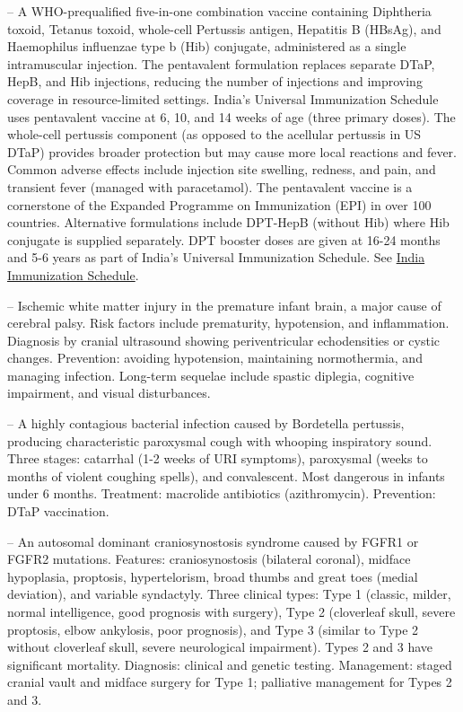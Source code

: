 -- A WHO-prequalified five-in-one combination vaccine containing Diphtheria toxoid, Tetanus toxoid, whole-cell Pertussis antigen, Hepatitis B (HBsAg), and Haemophilus influenzae type b (Hib) conjugate, administered as a single intramuscular injection. The pentavalent formulation replaces separate DTaP, HepB, and Hib injections, reducing the number of injections and improving coverage in resource-limited settings. India's Universal Immunization Schedule uses pentavalent vaccine at 6, 10, and 14 weeks of age (three primary doses). The whole-cell pertussis component (as opposed to the acellular pertussis in US DTaP) provides broader protection but may cause more local reactions and fever. Common adverse effects include injection site swelling, redness, and pain, and transient fever (managed with paracetamol). The pentavalent vaccine is a cornerstone of the Expanded Programme on Immunization (EPI) in over 100 countries. Alternative formulations include DPT-HepB (without Hib) where Hib conjugate is supplied separately. DPT booster doses are given at 16-24 months and 5-6 years as part of India's Universal Immunization Schedule. See \hyperlink{India Immunization Schedule}{India Immunization Schedule}.

-- Ischemic white matter injury in the premature infant brain, a major cause of cerebral palsy. Risk factors include prematurity, hypotension, and inflammation. Diagnosis by cranial ultrasound showing periventricular echodensities or cystic changes. Prevention: avoiding hypotension, maintaining normothermia, and managing infection. Long-term sequelae include spastic diplegia, cognitive impairment, and visual disturbances.

-- A highly contagious bacterial infection caused by Bordetella pertussis, producing characteristic paroxysmal cough with whooping inspiratory sound. Three stages: catarrhal (1-2 weeks of URI symptoms), paroxysmal (weeks to months of violent coughing spells), and convalescent. Most dangerous in infants under 6 months. Treatment: macrolide antibiotics (azithromycin). Prevention: DTaP vaccination.

-- An autosomal dominant craniosynostosis syndrome caused by FGFR1 or FGFR2 mutations. Features: craniosynostosis (bilateral coronal), midface hypoplasia, proptosis, hypertelorism, broad thumbs and great toes (medial deviation), and variable syndactyly. Three clinical types: Type 1 (classic, milder, normal intelligence, good prognosis with surgery), Type 2 (cloverleaf skull, severe proptosis, elbow ankylosis, poor prognosis), and Type 3 (similar to Type 2 without cloverleaf skull, severe neurological impairment). Types 2 and 3 have significant mortality. Diagnosis: clinical and genetic testing. Management: staged cranial vault and midface surgery for Type 1; palliative management for Types 2 and 3.

